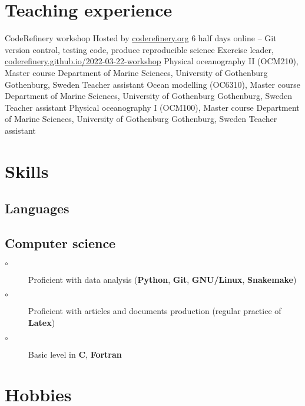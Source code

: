 \documentclass[11pt,a4paper,roman]{moderncv}
\begin{document}
\section{Teaching experience}
        {CodeRefinery workshop}
        {Hosted by \href{https://coderefinery.org}{coderefinery.org}}
        {6 half days online -- Git version control, testing code, produce reproducible science}
        {Exercise leader, \href{https://coderefinery.github.io/2022-03-22-workshop}{coderefinery.github.io/2022-03-22-workshop}}
        {}
        {Physical oceanography II (OCM210), Master course}
        {Department of Marine Sciences, University of Gothenburg}
        {Gothenburg, Sweden}
        {Teacher assistant}
        {}
        {Ocean modelling (OC6310), Master course}
        {Department of Marine Sciences, University of Gothenburg}
        {Gothenburg, Sweden}
        {Teacher assistant}
        {}
        {Physical oceanography I (OCM100), Master course}
        {Department of Marine Sciences, University of Gothenburg}
        {Gothenburg, Sweden}
        {Teacher assistant}
        {}

\section{Skills}
\subsection{Languages}


\subsection{Computer science}
\begin{description}
    \item[\hspace{\hintscolumnwidth}\hspace{\separatorcolumnwidth}\color{blue}$\circ$]
      Proficient with data analysis (\textbf{Python}, \textbf{Git},
      \textbf{GNU/Linux}, \textbf{Snakemake})
    \item[\hspace{\hintscolumnwidth}\hspace{\separatorcolumnwidth}\color{blue}$\circ$]
      Proficient with articles and documents production (regular practice of
      \textbf{Latex})
    \item[\hspace{\hintscolumnwidth}\hspace{\separatorcolumnwidth}\color{blue}$\circ$]
      Basic level in \textbf{C}, \textbf{Fortran}
\end{description}

\section{Hobbies}
\end{document}
